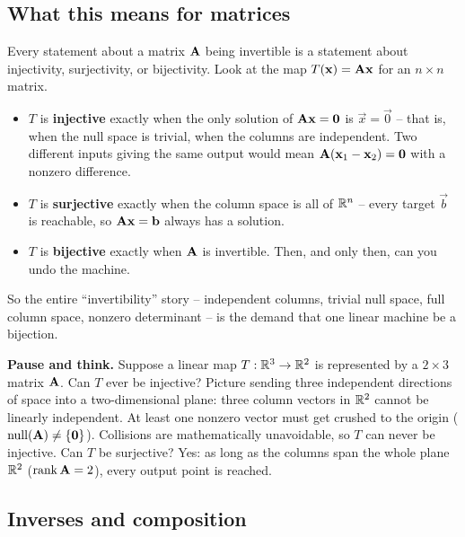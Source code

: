 \subsection{What this means for matrices}

Every statement about a matrix $\mathbf{A}$ being invertible is a statement about
injectivity, surjectivity, or bijectivity. Look at the map $T(\mathbf{x}) = \mathbf{A}\mathbf{x}$
for an $n\times n$ matrix.

\begin{itemize}
  \item $T$ is \textbf{injective} exactly when the only solution of $\mathbf{A}\mathbf{x} =
        \mathbf{0}$ is $\vec{x} = \vec{0}$ -- that is, when the null space is trivial, when
        the columns are independent. Two different inputs giving the same output would
        mean $\mathbf{A}(\mathbf{x}_1 - \mathbf{x}_2) = \mathbf{0}$ with a nonzero difference.
  \item $T$ is \textbf{surjective} exactly when the column space is all of $\mathbb{R}^n$ -- every
        target $\vec{b}$ is reachable, so $\mathbf{A}\mathbf{x} = \mathbf{b}$ always has a solution.
  \item $T$ is \textbf{bijective} exactly when $\mathbf{A}$ is invertible. Then, and only
        then, can you undo the machine.
\end{itemize}

So the entire ``invertibility'' story -- independent columns, trivial null space, full
column space, nonzero determinant -- is the demand that one linear machine be a bijection.

\begin{recoverybox}
\textbf{Pause and think.} Suppose a linear map $T : \mathbb{R}^3 \to \mathbb{R}^2$ is represented by a $2\times 3$ matrix $\mathbf{A}$.
Can $T$ ever be injective?
Picture sending three independent directions of space into a two-dimensional plane: three column vectors in $\mathbb{R}^2$ cannot be linearly independent. At least one nonzero vector must get crushed to the origin ($\operatorname{null}(\mathbf{A}) \ne \{\mathbf{0}\}$). Collisions are mathematically unavoidable, so $T$ can never be injective.
Can $T$ be surjective? Yes: as long as the columns span the whole plane $\mathbb{R}^2$ ($\operatorname{rank}\mathbf{A} = 2$), every output point is reached.
\end{recoverybox}

\subsection{Inverses and composition}

